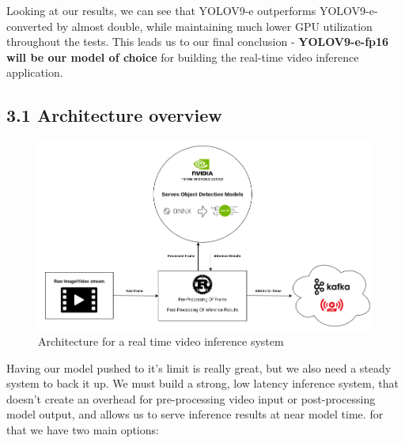 \documentclass[
]{article}
\begin{document}
Looking at our results, we can see that YOLOV9-e outperforms
YOLOV9-e-converted by almost double, while maintaining much lower GPU
utilization throughout the tests. This leads us to our final conclusion
- \textbf{YOLOV9-e-fp16 will be our model of choice} for building the
real-time video inference application.

\subsection{3.1 Architecture overview}\label{architecture-overview}

\begin{figure}[H]

{\centering \includegraphics[width=4.44444in,height=\textheight,keepaspectratio]{../images/architecture.png}

}

\caption{Architecture for a real time video inference system}

\end{figure}%

Having our model pushed to it's limit is really great, but we also need
a steady system to back it up. We must build a strong, low latency
inference system, that doesn't create an overhead for pre-processing
video input or post-processing model output, and allows us to serve
inference results at near model time. for that we have two main options:
\end{document}

